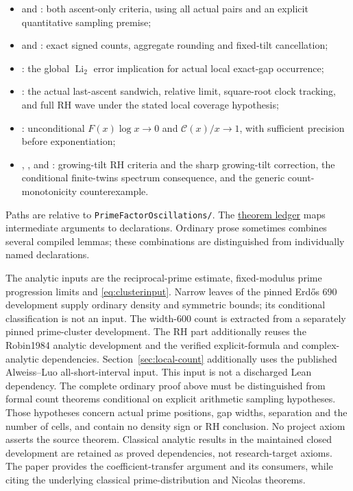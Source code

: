 \documentclass[11pt]{article}
\theoremstyle{definition}
\begin{document}
\begin{itemize}
: both localized
reversal-count equivalences, explicit cell selection and the
all-short-interval arithmetic input boundary;
\item {} and
: both ascent-only criteria,
using all actual pairs and an explicit quantitative sampling premise;
\item {} and
: exact signed counts,
aggregate rounding and fixed-tilt cancellation;
\item {}: the global
$\operatorname{Li}_2$ error implication for actual local exact-gap occurrence;
\item {}:
the actual last-ascent sandwich, relative limit, square-root clock
tracking, and full RH wave under the stated local coverage hypothesis;
\item {}: unconditional
$F(x)\log x\to0$ and $\mathcal C(x)/x\to1$, with sufficient
precision before exponentiation;
\item {},
,
 and
: growing-tilt
RH criteria and the sharp growing-tilt correction, the conditional
finite-twins spectrum consequence,
and the generic count-monotonicity counterexample.
\end{itemize}
Paths are relative to \texttt{PrimeFactorOscillations/}. The
\href{https://github.com/kimihiro64/prime-factor-oscillations/blob/main/paper/THEOREM_STATUS.md}{theorem ledger}
maps intermediate arguments to declarations. Ordinary prose
sometimes combines several compiled lemmas; these combinations
are distinguished from individually named declarations.

The analytic inputs are the reciprocal-prime estimate,
fixed-modulus prime progression limits and \eqref{eq:clusterinput}.
Narrow leaves of the pinned Erd\H{o}s 690 development supply
ordinary density and symmetric bounds; its conditional
classification is not an input. The width-$600$ count is
extracted from a separately pinned prime-cluster development.
The RH part additionally reuses the Robin1984 analytic development
and the verified explicit-formula and complex-analytic dependencies.
Section~\ref{sec:local-count} additionally uses the published
Alweiss--Luo all-short-interval input. This input is not a discharged
Lean dependency. The complete ordinary proof above must be distinguished
from formal count theorems conditional on explicit arithmetic sampling
hypotheses. Those hypotheses concern actual prime positions, gap widths,
separation and the number of cells, and contain no density sign or RH
conclusion. No project axiom asserts the source theorem.
Classical analytic results in the maintained closed development are
retained as proved dependencies, not
research-target axioms. The paper provides the coefficient-transfer
argument and its consumers, while citing the underlying classical
prime-distribution and Nicolas theorems.
\end{document}
